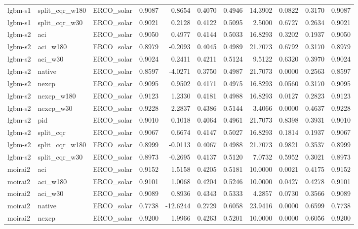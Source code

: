 \begin{tabular}{lllrrrrrrrr}
lgbm-s1 & split_cqr_w180 & ERCO_solar & 0.9087 & 0.8654 & 0.4070 & 0.4946 & 14.3902 & 0.0822 & 0.3170 & 0.9087 \\
lgbm-s1 & split_cqr_w30 & ERCO_solar & 0.9021 & 0.2128 & 0.4122 & 0.5095 & 2.5000 & 0.6727 & 0.2634 & 0.9021 \\
lgbm-s2 & aci & ERCO_solar & 0.9050 & 0.4977 & 0.4144 & 0.5033 & 16.8293 & 0.3202 & 0.1937 & 0.9050 \\
lgbm-s2 & aci_w180 & ERCO_solar & 0.8979 & -0.2093 & 0.4045 & 0.4989 & 21.7073 & 0.6792 & 0.3170 & 0.8979 \\
lgbm-s2 & aci_w30 & ERCO_solar & 0.9024 & 0.2411 & 0.4211 & 0.5124 & 9.5122 & 0.6320 & 0.3970 & 0.9024 \\
lgbm-s2 & native & ERCO_solar & 0.8597 & -4.0271 & 0.3750 & 0.4987 & 21.7073 & 0.0000 & 0.2563 & 0.8597 \\
lgbm-s2 & nexcp & ERCO_solar & 0.9095 & 0.9502 & 0.4171 & 0.4975 & 16.8293 & 0.0560 & 0.3170 & 0.9095 \\
lgbm-s2 & nexcp_w180 & ERCO_solar & 0.9123 & 1.2330 & 0.4181 & 0.4988 & 16.8293 & 0.0127 & 0.2823 & 0.9123 \\
lgbm-s2 & nexcp_w30 & ERCO_solar & 0.9228 & 2.2837 & 0.4386 & 0.5144 & 3.4066 & 0.0000 & 0.4637 & 0.9228 \\
lgbm-s2 & pid & ERCO_solar & 0.9010 & 0.1018 & 0.4064 & 0.4961 & 21.7073 & 0.8398 & 0.3931 & 0.9010 \\
lgbm-s2 & split_cqr & ERCO_solar & 0.9067 & 0.6674 & 0.4147 & 0.5027 & 16.8293 & 0.1814 & 0.1937 & 0.9067 \\
lgbm-s2 & split_cqr_w180 & ERCO_solar & 0.8999 & -0.0113 & 0.4067 & 0.4988 & 21.7073 & 0.9821 & 0.3537 & 0.8999 \\
lgbm-s2 & split_cqr_w30 & ERCO_solar & 0.8973 & -0.2695 & 0.4137 & 0.5120 & 7.0732 & 0.5952 & 0.3021 & 0.8973 \\
moirai2 & aci & ERCO_solar & 0.9152 & 1.5158 & 0.4205 & 0.5181 & 10.0000 & 0.0021 & 0.4175 & 0.9152 \\
moirai2 & aci_w180 & ERCO_solar & 0.9101 & 1.0068 & 0.4204 & 0.5246 & 10.0000 & 0.0427 & 0.4278 & 0.9101 \\
moirai2 & aci_w30 & ERCO_solar & 0.9089 & 0.8936 & 0.4343 & 0.5333 & 4.2857 & 0.0730 & 0.3566 & 0.9089 \\
moirai2 & native & ERCO_solar & 0.7738 & -12.6244 & 0.2729 & 0.6058 & 23.9416 & 0.0000 & 0.6599 & 0.7738 \\
moirai2 & nexcp & ERCO_solar & 0.9200 & 1.9966 & 0.4263 & 0.5201 & 10.0000 & 0.0000 & 0.6056 & 0.9200 \\

\end{tabular}
